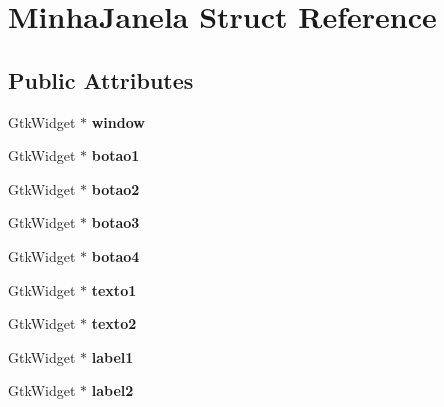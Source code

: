 \hypertarget{struct_minha_janela}{}\section{Minha\+Janela Struct Reference}
\label{struct_minha_janela}
\subsection*{Public Attributes}
\begin{DoxyCompactItemize}
\item 
\mbox{\label{struct_minha_janela_ac6871feae1448ddabb765a0acda849fa}} 
Gtk\+Widget $\ast$ {\bfseries window}
\item 
\mbox{\label{struct_minha_janela_a582653e7ee07ac6d31ce37b1dd22cea2}} 
Gtk\+Widget $\ast$ {\bfseries botao1}
\item 
\mbox{\label{struct_minha_janela_a11faa9e3f18ba3dac94e2f0c66e5a251}} 
Gtk\+Widget $\ast$ {\bfseries botao2}
\item 
\mbox{\label{struct_minha_janela_a347b0646163a581f13f498faac77af89}} 
Gtk\+Widget $\ast$ {\bfseries botao3}
\item 
\mbox{\label{struct_minha_janela_a9d912c7776cf53c5a533275a82fe9c5c}} 
Gtk\+Widget $\ast$ {\bfseries botao4}
\item 
\mbox{\label{struct_minha_janela_ae4ff4478d276463a5948e1f003c78feb}} 
Gtk\+Widget $\ast$ {\bfseries texto1}
\item 
\mbox{\label{struct_minha_janela_a0273fe2f7a447979056fd3dd43d985df}} 
Gtk\+Widget $\ast$ {\bfseries texto2}
\item 
\mbox{\label{struct_minha_janela_adb8f0eedd00d9fe4b5e29a9b69627ecf}} 
Gtk\+Widget $\ast$ {\bfseries label1}
\item 
\mbox{\label{struct_minha_janela_a542fe1554832884b1d2aebfce6cd1696}} 
Gtk\+Widget $\ast$ {\bfseries label2}
\item 

\end{DoxyCompactItemize}
